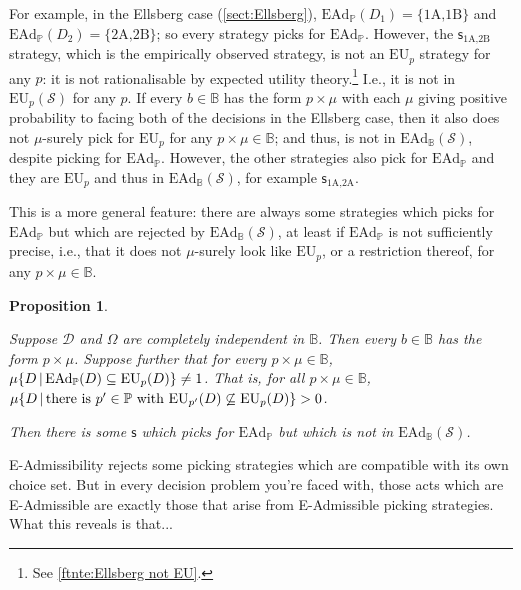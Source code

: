 \documentclass[a4paper]{article}
\newtheorem{proposition}[theorem]{Proposition}
\newcommand\D{\mathcal{D}}
\renewcommand\S{\mathcal{S}}
\newcommand\s{\mathsf{s}}
\renewcommand\P{\mathbb{P}} %
\newcommand\EU{\mathrm{EU}}
\newcommand\EAd{\mathrm{EAd}}
\newcommand{\IB}{\mathbb{B}}
\newcommand{\IP}{\P}
\newcommand{\pb}{b}
\renewcommand{\color}[1]{}
\newcommand{\Strategies}{\mathcal{S}}
\newcommand\SetDelimiter[1][]{
	\nonscript\,#1\vert \allowbreak \nonscript\,\mathopen{}}
\providecommand\given{\SetDelimiter}
\newenvironment{CCM rewritten}
{\begingroup\color{blue}} %
{\endgroup}              %
\begin{document}
{\color{violet}	For example, in the Ellsberg case (\cref{sect:Ellsberg}), $\EAd_\IP(D_1)=\{\text{1A,1B}\}$ and $\EAd_\IP(D_2)=\{\text{2A,2B}\}$; so every strategy picks for $\EAd_\IP$. However, the $\s_{\text{1A,2B}}$ strategy, which is the empirically observed strategy, is not an $\EU_p$ strategy for any $p$: it is not rationalisable by expected utility theory.\footnote{See \cref{ftnte:Ellsberg not EU}.} I.e., it is not in $\EU_p(\Strategies)$ for any $p$. If every $b\in\IB$ has the form $p\times\mu$ with each $\mu$ giving positive probability to facing both of the decisions in the Ellsberg case, then it also does not $\mu$-surely pick for $\EU_p$ for any $p\times\mu\in\IB$; and thus, is not in $\EAd_\IB(\S)$, despite picking for $\EAd_\IP$. However, the other strategies also pick for $\EAd_\IP$ and they are $\EU_p$ and thus in $\EAd_\IB(\S)$, for example $\s_{\text{1A,2A}}$. 



This is a more general feature: there are always some strategies which picks for $\EAd_\IP$ but which are rejected by $\EAd_\IB(\Strategies)$, at least if $\EAd_\IP$ is not sufficiently precise, i.e., that it does not $\mu$-surely look like $\EU_p$, or a restriction thereof, for any $p\times\mu\in\IB$. 
\begin{proposition}\label{thm:ead-existsimpermissibel[indep]}

{Suppose $\D$ and $\Omega$ are completely independent in $\IB$. Then every $\pb\in\IB$ has the form $p\times\mu$. Suppose further that for every $p\times \mu\in \IB$, $\mu\{D\given \EAd_\IP(D)\subseteq \EU_p(D)\}\neq 1$. That is, for all $p\times \mu\in \IB$, $\mu\{D\given \text{there is $p'\in\IP$ with }\EU_{p'}(D)\not\subseteq\EU_p(D)\}>0$. }

	
	
	Then there is some $\s$ which picks for $\EAd_\IP$ but which is not in $\EAd_\IB(\Strategies)$.
\end{proposition}


{\color{red}E-Admissibility rejects some picking strategies which are compatible with its own choice set. But in every decision problem you're faced with, those acts which are E-Admissible are exactly those that arise from E-Admissible picking strategies. What this reveals is that...}



}
\end{document}
